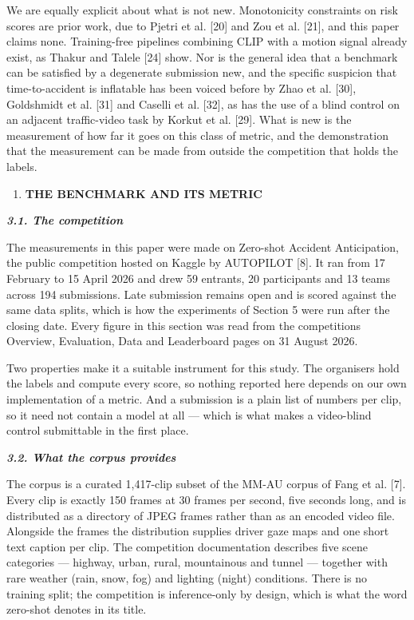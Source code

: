 We are equally explicit about what is not new. Monotonicity constraints on risk scores are prior work, due to Pjetri et al. {[}20{]} and Zou et al. {[}21{]}, and this paper claims none. Training-free pipelines combining CLIP with a motion signal already exist, as Thakur and Talele {[}24{]} show. Nor is the general idea that a benchmark can be satisfied by a degenerate submission new, and the specific suspicion that time-to-accident is inflatable has been voiced before by Zhao et al. {[}30{]}, Goldshmidt et al. {[}31{]} and Caselli et al. {[}32{]}, as has the use of a blind control on an adjacent traffic-video task by Korkut et al. {[}29{]}. What is new is the measurement of how far it goes on this class of metric, and the demonstration that the measurement can be made from outside the competition that holds the labels.

\begin{enumerate}
\def\labelenumi{\arabic{enumi}.}
\setcounter{enumi}{1}
\item
  \textbf{THE BENCHMARK AND ITS METRIC}
\end{enumerate}

\emph{\textbf{3.1. The competition}}

The measurements in this paper were made on Zero-shot Accident Anticipation, the public competition hosted on Kaggle by AUTOPILOT {[}8{]}. It ran from 17 February to 15 April 2026 and drew 59 entrants, 20 participants and 13 teams across 194 submissions. Late submission remains open and is scored against the same data splits, which is how the experiments of Section 5 were run after the closing date. Every figure in this section was read from the competition\textquotesingle s Overview, Evaluation, Data and Leaderboard pages on 31 August 2026.

Two properties make it a suitable instrument for this study. The organisers hold the labels and compute every score, so nothing reported here depends on our own implementation of a metric. And a submission is a plain list of numbers per clip, so it need not contain a model at all --- which is what makes a video-blind control submittable in the first place.

\emph{\textbf{3.2. What the corpus provides}}

The corpus is a curated 1,417-clip subset of the MM-AU corpus of Fang et al. {[}7{]}. Every clip is exactly 150 frames at 30 frames per second, five seconds long, and is distributed as a directory of JPEG frames rather than as an encoded video file. Alongside the frames the distribution supplies driver gaze maps and one short text caption per clip. The competition documentation describes five scene categories --- highway, urban, rural, mountainous and tunnel --- together with rare weather (rain, snow, fog) and lighting (night) conditions. There is no training split; the competition is inference-only by design, which is what the word zero-shot denotes in its title.

